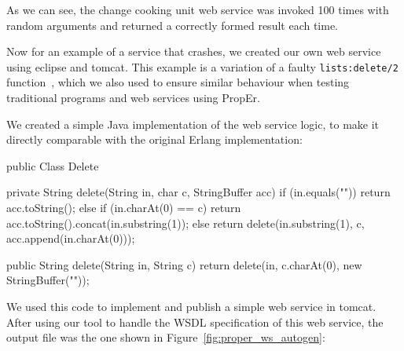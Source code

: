 \documentclass[copyright]{eptcs}
\begin{document}
As we can see, the change cooking unit web service was invoked 100
times with random arguments and returned a correctly formed result
each time.

Now for an example of a service that crashes, we created our own web
service using eclipse and tomcat. This example is a variation of a
faulty \texttt{lists:delete/2} function~\cite{PropErTypes@Erlang-11},
which we also used to ensure similar behaviour when testing
traditional programs and web services using PropEr.

We created a simple Java implementation of the web service logic, to
make it directly comparable with the original Erlang implementation:
\begin{lstjava}
public Class Delete {
    private String delete(String in, char c, StringBuffer acc) {
        if (in.equals("")) {
            return acc.toString();
        }
        else if (in.charAt(0) == c) {
            return acc.toString().concat(in.substring(1));
        }
        else {
            return delete(in.substring(1), c, acc.append(in.charAt(0)));
        }
    }
    
    public String delete(String in, String c) {
        return delete(in, c.charAt(0), new StringBuffer(""));
    } 
}
\end{lstjava}

We used this code to implement and publish a simple web service in
tomcat. After using our tool to handle the WSDL specification of this
web service, the output file was the one shown in
Figure~\ref{fig:proper_ws_autogen}:
\end{document}
